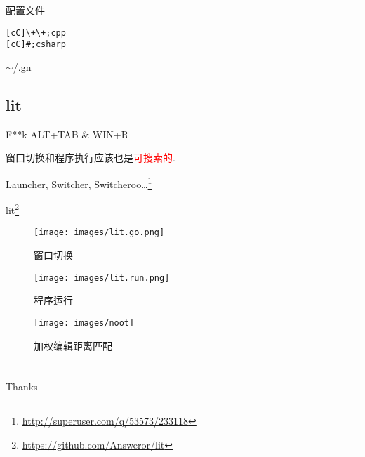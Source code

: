 \documentclass[compress]{beamer}
\begin{document}
\begin{frame}[fragile]{配置文件}
    \begin{listing}[H]
        \begin{verbatim}
[cC]\+\+;cpp
[cC]#;csharp
        \end{verbatim}
        \caption{$\sim$/.gn}
    \end{listing}
\end{frame}

\subsection{lit}

\begin{frame}{F**k ALT+TAB \& WIN+R}
    \begin{center}
        窗口切换和程序执行应该也是\textcolor{red}{可搜索的}.
        \pause
        \par
        Launcher, Switcher, Switcheroo\ldots\footnote{\url{http://superuser.com/q/53573/233118}}
        \pause
        \par
        \vspace{1em}
        lit\footnote{\url{https://github.com/Answeror/lit}}
    \end{center}
\end{frame}

\begin{frame}{\insertsubsection}
    \begin{figure}
        \centering
        \texttt{[image: images/lit.go.png]}
        \caption{窗口切换}
    \end{figure}
\end{frame}

\begin{frame}{\insertsubsection}
    \begin{figure}
        \centering
        \texttt{[image: images/lit.run.png]}
        \caption{程序运行}
    \end{figure}
\end{frame}

\begin{frame}{\insertsubsection}
    \begin{figure}
        \centering
        \texttt{[image: images/noot]}
        \caption{加权编辑距离匹配}
    \end{figure}
\end{frame}

\section{}

\begin{frame}
    \begin{center}
        \huge{Thanks}
    \end{center}
\end{frame}
\end{document}
